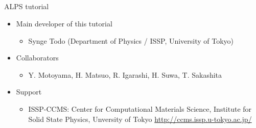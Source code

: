 \subsection*{\redb\whiteb\greenb}
\begin{frame}[t,fragile]{ALPS tutorial}
  \begin{itemize}
    \setlength{\itemsep}{1em}
  \item Main developer of this tutorial
    \begin{itemize}
    \item Synge Todo (Department of Physics / ISSP, University of Tokyo)
    \end{itemize}
  \item Collaborators
    \begin{itemize}
    \item Y. Motoyama, H. Matsuo, R. Igarashi, H. Suwa, T. Sakashita
    \end{itemize}
  \item Support
    \begin{itemize}
    \item ISSP-CCMS: Center for Computational Materials Science, Institute for Solid State Physics, Unversity of Tokyo \url{http://ccms.issp.u-tokyo.ac.jp/} \\[2em]
    \end{itemize}
  \end{itemize}
\end{frame}



             
